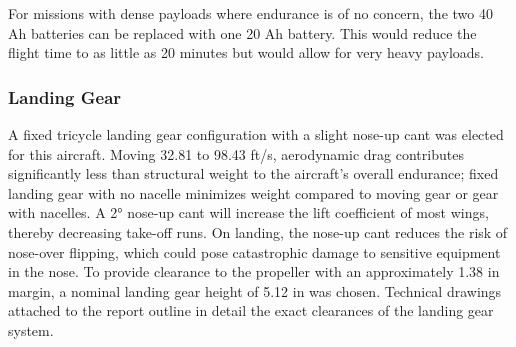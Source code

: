 \documentclass[12pt]{article}
\begin{document}
	For missions with dense payloads where endurance is of no concern, the two 40 Ah batteries can be replaced with one 20 Ah battery. This would reduce the flight time to as little as 20 minutes but would allow for very heavy payloads.
	
	\subsubsection{Landing Gear}
	A fixed tricycle landing gear configuration with a slight nose-up cant was elected for this aircraft. Moving 32.81 to 98.43 ft/s, aerodynamic drag contributes significantly less than structural weight to the aircraft's overall endurance; fixed landing gear with no nacelle minimizes weight compared to moving gear or gear with nacelles. A 2° nose-up cant will increase the lift coefficient of most wings, thereby decreasing take-off runs. On landing, the nose-up cant reduces the risk of nose-over flipping, which could pose catastrophic damage to sensitive equipment in the nose. To provide clearance to the propeller with an approximately 1.38 in margin, a nominal landing gear height of 5.12 in was chosen. Technical drawings attached to the report outline in detail the exact clearances of the landing gear system. 
	
	\newpage
	
	\appendix

	
	
\end{document}
